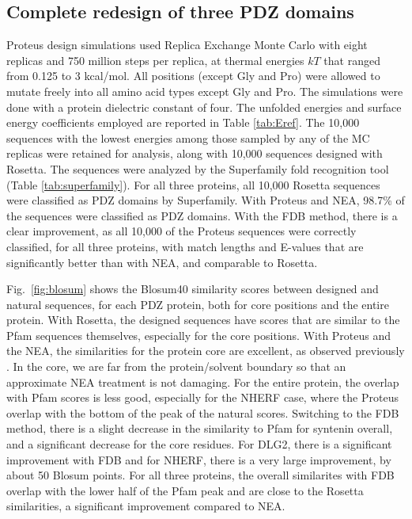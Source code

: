 \documentclass[a4paper,12pt]{article}
\begin{document}
\subsection{Complete redesign of three PDZ domains}
Proteus design simulations used Replica Exchange Monte Carlo with eight replicas and 750 million steps per replica, at
thermal energies $kT$ that ranged from 0.125 to 3 kcal/mol. All positions (except Gly and Pro) were allowed to mutate
freely into all amino acid types except Gly and Pro. The simulations were done with a protein dielectric constant of
four. The unfolded energies and surface energy coefficients employed are reported in Table \ref{tab:Eref}. The 10,000
sequences with the lowest energies among those sampled by any of the MC replicas were retained for analysis, along
with 10,000 sequences designed with Rosetta. The sequences were analyzed by the Superfamily fold recognition tool
\cite{Madera04,Wilson07} (Table \ref{tab:superfamily}). For all three proteins, all 10,000 Rosetta sequences were
classified as PDZ domains by Superfamily. With Proteus and NEA, 98.7\% of the sequences were classified as PDZ
domains. With the FDB method, there is a clear improvement, as all 10,000 of the Proteus sequences were correctly
classified, for all three proteins, with match lengths and E-values that are significantly better than with NEA,
and comparable to Rosetta.

Fig.\ \ref{fig:blosum} shows the Blosum40 similarity scores between designed and natural sequences, for each PDZ
protein, both for core positions and the entire protein. With Rosetta, the designed sequences have scores that
are similar to the Pfam sequences themselves, especially for the core positions. With Proteus and the NEA, the
similarities for the protein core are excellent, as observed previously \cite{Mignon17}. In the core, we are
far from the protein/solvent boundary so that an approximate NEA treatment is not damaging. For the entire protein,
the overlap with Pfam scores is less good, especially for the NHERF case, where the Proteus  overlap with the bottom
of the peak of the natural scores. Switching to the FDB method, there is a slight decrease in the similarity to
Pfam for syntenin overall, and a significant decrease for the core residues. For DLG2, there is a significant
improvement with FDB and for NHERF, there is a very large improvement, by about 50 Blosum points. For all three
proteins, the overall similarites with FDB overlap with the lower half of the Pfam peak and are close to the
Rosetta similarities, a significant improvement compared to NEA.
\end{document}
